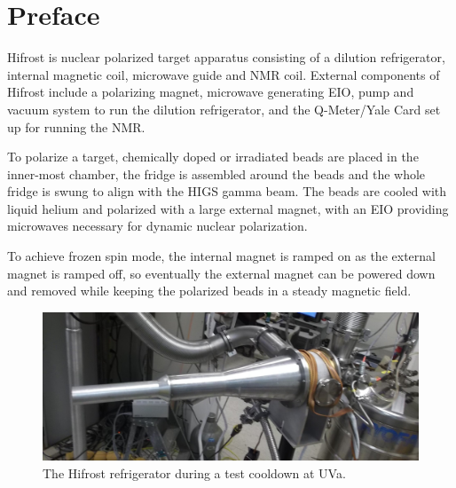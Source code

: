 \chapter*{Preface}
\thispagestyle{empty} 


Hifrost is nuclear polarized target apparatus consisting of a dilution refrigerator, internal magnetic coil, microwave guide and NMR coil.  External components of Hifrost include a polarizing magnet, microwave generating EIO, pump and vacuum system to run the dilution refrigerator, and the Q-Meter/Yale Card set up for running the NMR. 


To polarize a target, chemically doped or irradiated beads are placed in the inner-most chamber, the fridge is assembled around the beads and the whole fridge is swung to align with the HIGS gamma beam.  The beads are cooled with liquid helium and polarized with a large external magnet, with an EIO providing microwaves necessary for dynamic nuclear polarization.


To achieve frozen spin mode, the internal magnet is ramped on as the external magnet is ramped off, so eventually the external magnet can be powered down and removed while keeping the polarized beads in a steady magnetic field.

\begin{figure}[h]
 \centering
 \includegraphics[width=\textwidth]{./img/intro-image.jpg}
 \caption{The Hifrost refrigerator during a test cooldown at UVa.}
 \label{fig:intro-image}
\end{figure}
